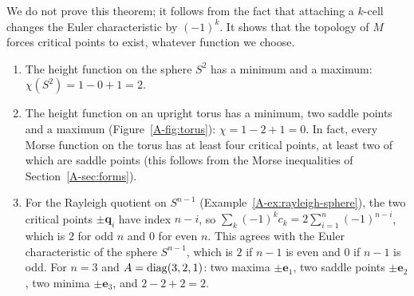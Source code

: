 We do not prove this theorem; it follows from the fact that attaching a $k$-cell changes the Euler characteristic by $(-1)^k$. It shows that the topology of $M$ forces critical points to exist, whatever function we choose.

\begin{example}\label{A-ex:morse-relation}
    \begin{enumerate}
        \item The height function on the sphere $S^2$ has a minimum and a maximum: $\chi(S^2) = 1 - 0 + 1 = 2$.
        \item The height function on an upright torus has a minimum, two saddle points and a maximum (Figure~\ref{A-fig:torus}): $\chi = 1 - 2 + 1 = 0$. In fact, every Morse function on the torus has at least four critical points, at least two of which are saddle points (this follows from the Morse inequalities of Section~\ref{A-sec:forms}).
        \item For the Rayleigh quotient on $S^{n-1}$ (Example~\ref{A-ex:rayleigh-sphere}), the two critical points $\pm\mathbf{q}_i$ have index $n - i$, so $\sum_k (-1)^k c_k = 2\sum_{i=1}^n (-1)^{n-i}$, which is $2$ for odd $n$ and $0$ for even $n$. This agrees with the Euler characteristic of the sphere $S^{n-1}$, which is $2$ if $n - 1$ is even and $0$ if $n - 1$ is odd. For $n = 3$ and $A = \operatorname{diag}(3, 2, 1)$: two maxima $\pm\mathbf{e}_1$, two saddle points $\pm\mathbf{e}_2$, two minima $\pm\mathbf{e}_3$, and $2 - 2 + 2 = 2$.
    \end{enumerate}
\end{example}

